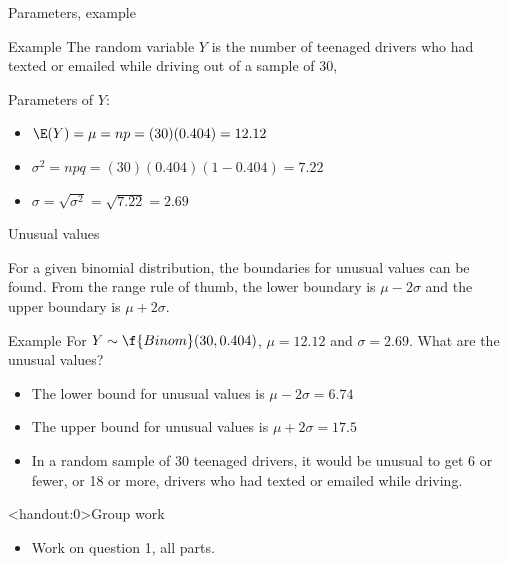 \documentclass[xcolor=table, aspectratio=169, bigger, handout]{beamer}
\begin{document}
\begin{frame}{Parameters, example}
\begin{exampleblock}{Example}
The random variable $Y$ is the number of teenaged drivers who had texted or emailed while driving out of a sample of 30,\\ \smallskip
{}

Parameters of $Y$:
\begin{itemize}
\pause\item $\E(Y) = \mu = np = (30)(0.404) = 12.12$
\pause\item $\sigma^2 = npq = (30)(0.404)(1-0.404) = 7.22$
\pause\item $\sigma = \sqrt{\sigma^2} = \sqrt{7.22} = 2.69$
\end{itemize}
\end{exampleblock}
\end{frame}

\begin{frame}{Unusual values}
\begin{block}{}
For a given binomial distribution, the boundaries for unusual values can be found. From the range rule of thumb, the lower boundary is $\mu - 2 \sigma$ and the upper boundary is $\mu + 2\sigma$.
\end{block}
\pause
\begin{exampleblock}{Example}
For $Y \sim \f{Binom}(30, 0.404)$, $\mu = 12.12$ and $\sigma = 2.69$. What are the unusual values?
\begin{itemize}
\pause\item The lower bound for unusual values is $\mu - 2 \sigma = 6.74$
\pause\item The upper bound for unusual values is $\mu + 2 \sigma = 17.5$
\pause\item In a random sample of 30 teenaged drivers, it would be unusual to get 6 or fewer, or 18 or more, drivers who had texted or emailed while driving.
\end{itemize}
\end{exampleblock}
\end{frame}

\begin{frame}<handout:0>{Group work}
\begin{block}{}
\large
\begin{itemize}
\item Work on question 1, all parts.
\end{itemize}
\end{block}
\end{frame}
\end{document}
